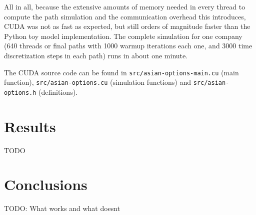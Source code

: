\documentclass[%
 reprint,
 amsmath,amssymb,
 aps,
 nofootinbib,
 showpacs
]{revtex4-1}
\begin{document}
All in all, because the extensive amounts of memory needed in every thread to compute the path simulation and the communication overhead this introduces, CUDA was not as fast as expected, but still orders of magnitude faster than the Python toy model implementation.
The complete simulation for one company (640 threads or final paths with 1000 warmup iterations each one, and 3000 time discretization steps in each path) runs in about one minute.

The CUDA source code can be found in \texttt{src/asian-options-main.cu} (main function), \texttt{src/asian-options.cu} (simulation functions) and \texttt{src/asian-options.h} (definitions).

\section{\label{sec:results}Results}

TODO

\section{\label{sec:conclusions}Conclusions}

TODO: What works and what doesnt

\clearpage



\end{document}
